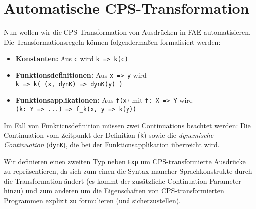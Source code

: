 \documentclass[]{article}
\begin{document}
\hypertarget{automatische-cps-transformation}{%
\section{Automatische
CPS-Transformation}\label{automatische-cps-transformation}}

Nun wollen wir die CPS-Transformation von Ausdrücken in FAE
automatisieren. Die Transformationsregeln können folgendermaßen
formalisiert werden:

\begin{itemize}
\item
  \textbf{Konstanten:} Aus \texttt{c} wird
  \texttt{k\ =\textgreater{}\ k(c)}
\item
  \textbf{Funktionsdefinitionen:} Aus \texttt{x\ =\textgreater{}\ y}
  wird
  \texttt{k\ =\textgreater{}\ k(\ (x,\ dynK)\ =\textgreater{}\ dynK(y)\ )}
\item
  \textbf{Funktionsapplikationen:} Aus \texttt{f(x)} mit
  \texttt{f:\ X\ =\textgreater{}\ Y} wird
  \texttt{(k:\ Y\ =\textgreater{}\ ...)\ =\textgreater{}\ f\_k(x,\ y\ =\textgreater{}\ k(y))}
\end{itemize}

Im Fall von Funktionsdefinition müssen zwei Continuations beachtet
werden: Die Continuation vom Zeitpunkt der Definition (\texttt{k}) sowie
die \emph{dynamische Continuation} (\texttt{dynK}), die bei der
Funktionsapplikation überreicht wird.

Wir definieren einen zweiten Typ neben \texttt{Exp} um
CPS-transformierte Ausdrücke zu repräsentieren, da sich zum einen die
Syntax mancher Sprachkonstrukte durch die Transformation ändert (es
kommt der zusätzliche Continuation-Parameter hinzu) und zum anderen um
die Eigenschaften von CPS-transformierten Programmen explizit zu
formulieren (und sicherzustellen).
\end{document}
